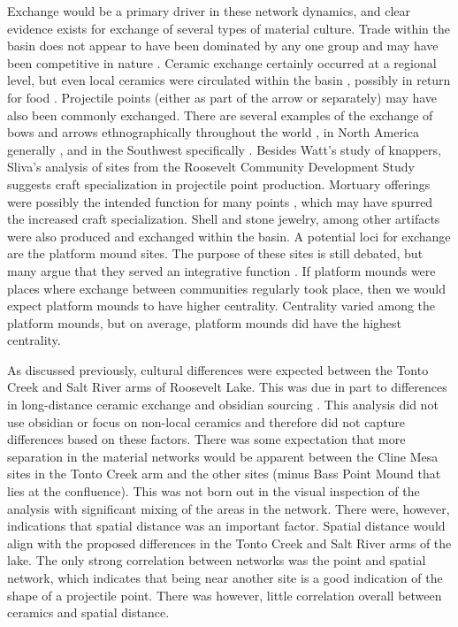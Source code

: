 \documentclass[]{interact}
\theoremstyle{plain}%
\theoremstyle{definition}
\theoremstyle{remark}
\begin{document}
Exchange would be a primary driver in these network dynamics, and clear
evidence exists for exchange of several types of material culture. Trade
within the basin does not appear to have been dominated by any one group
and may have been competitive in nature \citep[p.~127-128]{Rice1998-cu}.
Ceramic exchange certainly occurred at a regional level, but even local
ceramics were circulated within the basin
\citep{Heidke2000-nr, Miksa1995-qw, Stark1992-vu}, possibly in return
for food \citep[p.290-291]{Clark2004-uw}. Projectile points (either as
part of the arrow or separately) may have also been commonly exchanged.
There are several examples of the exchange of bows and arrows
ethnographically throughout the world
\citep[e.g.,][]{Mauss1966-nm, Nishiaki2013-lc, Wiessner1983-ei}, in
North America generally \citep[e.g.,][]{Hoffman1896-xl, Radin1923-gf},
and in the Southwest specifically
\citep[e.g.,][]{Beaglehole1936-ul, Dittert1959-rz, Fewkes1898-oj, griffen1969a, Parsons1939-xg, Simpson1953-ob}.
Besides Watt's study of knappers, Sliva's
\citeyearpar[p.~539]{Sliva2002-oz} analysis of sites from the Roosevelt
Community Development Study suggests craft specialization in projectile
point production. Mortuary offerings were possibly the intended function
for many points \citep[p.~543]{Sliva2002-oz}, which may have spurred the
increased craft specialization. Shell and stone jewelry, among other
artifacts were also produced and exchanged within the basin. A potential
loci for exchange are the platform mound sites. The purpose of these
sites is still debated, but many argue that they served an integrative
function
\citetext{\citealp[e.g.,][]{Abbott2006-fg}; \citealp{Adler1990-ws}; \citealp{Clark2004-uw}; \citealp{Craig1995-qo}; \citealp[p.~112-165]{Craig1994-bg}; \citealp[p.~439]{Doelle1995-qd}}.
If platform mounds were places where exchange between communities
regularly took place, then we would expect platform mounds to have
higher centrality. Centrality varied among the platform mounds, but on
average, platform mounds did have the highest centrality.

As discussed previously, cultural differences were expected between the
Tonto Creek and Salt River arms of Roosevelt Lake. This was due in part
to differences in long-distance ceramic exchange and obsidian sourcing
\citep{Lyons2013-ya, Simon2001-am}. This analysis did not use obsidian
or focus on non-local ceramics and therefore did not capture differences
based on these factors. There was some expectation that more separation
in the material networks would be apparent between the Cline Mesa sites
in the Tonto Creek arm and the other sites (minus Bass Point Mound that
lies at the confluence). This was not born out in the visual inspection
of the analysis with significant mixing of the areas in the network.
There were, however, indications that spatial distance was an important
factor. Spatial distance would align with the proposed differences in
the Tonto Creek and Salt River arms of the lake. The only strong
correlation between networks was the point and spatial network, which
indicates that being near another site is a good indication of the shape
of a projectile point. There was however, little correlation overall
between ceramics and spatial distance.
\end{document}
